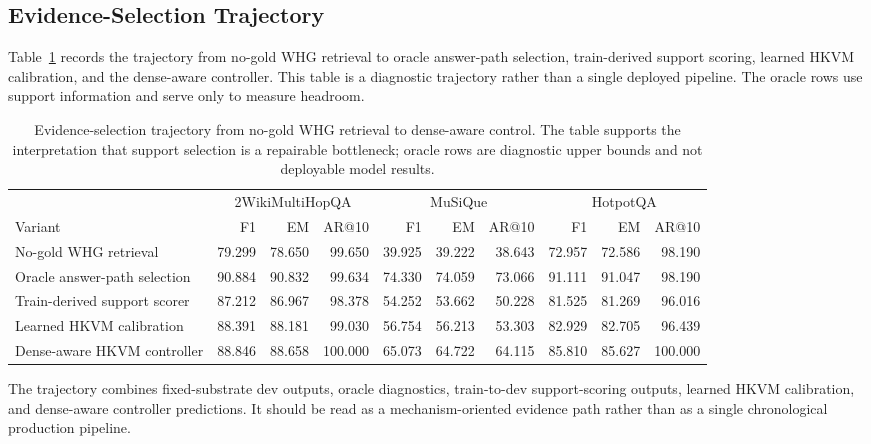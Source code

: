 \documentclass[conference]{IEEEtran}
\begin{document}
\subsection{Evidence-Selection Trajectory}

Table~\ref{tab:supp_trajectory} records the trajectory from no-gold WHG retrieval to oracle answer-path selection, train-derived support scoring, learned HKVM calibration, and the dense-aware controller. This table is a diagnostic trajectory rather than a single deployed pipeline. The oracle rows use support information and serve only to measure headroom.

\begin{table}[t]
\caption{Evidence-selection trajectory from no-gold WHG retrieval to dense-aware control. The table supports the interpretation that support selection is a repairable bottleneck; oracle rows are diagnostic upper bounds and not deployable model results.}
\label{tab:supp_trajectory}
\centering
\scriptsize
\begin{tabular*}{1.0\textwidth}{@{\extracolsep{\fill}} l rrr rrr rrr @{}}
\toprule
& \multicolumn{3}{c}{2WikiMultiHopQA} & \multicolumn{3}{c}{MuSiQue} & \multicolumn{3}{c}{HotpotQA} \\
\cmidrule(lr){2-4} \cmidrule(lr){5-7} \cmidrule(lr){8-10}
Variant & F1 & EM & AR@10 & F1 & EM & AR@10 & F1 & EM & AR@10 \\
\midrule
No-gold WHG retrieval & 79.299 & 78.650 & 99.650 & 39.925 & 39.222 & 38.643 & 72.957 & 72.586 & 98.190 \\
Oracle answer-path selection & 90.884 & 90.832 & 99.634 & 74.330 & 74.059 & 73.066 & 91.111 & 91.047 & 98.190 \\
Train-derived support scorer & 87.212 & 86.967 & 98.378 & 54.252 & 53.662 & 50.228 & 81.525 & 81.269 & 96.016 \\
Learned HKVM calibration & 88.391 & 88.181 & 99.030 & 56.754 & 56.213 & 53.303 & 82.929 & 82.705 & 96.439 \\
Dense-aware HKVM controller & 88.846 & 88.658 & 100.000 & 65.073 & 64.722 & 64.115 & 85.810 & 85.627 & 100.000 \\
\bottomrule
\end{tabular*}
\end{table}

The trajectory combines fixed-substrate dev outputs, oracle diagnostics, train-to-dev support-scoring outputs, learned HKVM calibration, and dense-aware controller predictions. It should be read as a mechanism-oriented evidence path rather than as a single chronological production pipeline.
\end{document}
